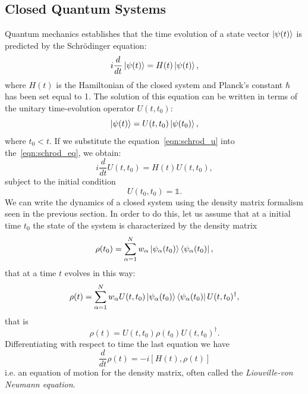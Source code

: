 \subsection{Closed Quantum Systems}
\label{closed_systems}
Quantum mechanics establishes that the time evolution of a state vector $\ket{\psi(t)}$ is predicted by the Schrödinger equation:
\begin{equation}
\label{eqn:schrod_eq}
    i\frac{d}{dt}\ket{\psi(t)} = H(t)\ket{\psi(t)},
\end{equation}
where $H(t)$ is the Hamiltonian of the closed system and Planck's constant $\hbar$ has been set equal to 1.
The solution of this equation can be written in terms of the unitary time-evolution operator $U(t, t_0)$:
\begin{equation}
\label{eqn:schrod_u}
    \ket{\psi(t)} = U(t, t_0)\ket{\psi(t_0)},
\end{equation}
where $t_0 < t$. If we substitute the equation~\ref{eqn:schrod_u} into the~\ref{eqn:schrod_eq}, we obtain:
\begin{equation}
    i\frac{d}{dt}U(t, t_0) = H(t)U(t, t_0),
\end{equation}
subject to the initial condition
\begin{equation}
    U(t_0, t_0) = \mathds{1}.
\end{equation}
We can write the dynamics of a closed system using the density matrix formalism seen in the previous section. In order to do this, let us assume that at a initial time $t_0$ the state of the system is characterized by the density matrix
\begin{equation*}
    \rho(t_0) = \sum_{\alpha = 1}^N w_\alpha \ket{\psi_\alpha(t_0)} \bra{\psi_\alpha(t_0)},
\end{equation*}
that at a time $t$ evolves in this way:
\begin{equation*}
    \rho(t) = \sum_{\alpha = 1}^N w_\alpha U(t,t_0)\ket{\psi_\alpha(t_0)} \bra{\psi_\alpha(t_0)}U(t,t_0)^\dagger,
\end{equation*}
that is
\begin{equation*}
     \rho(t) = U(t,t_0) \rho(t_0) U(t,t_0)^\dagger.
\end{equation*}
Differentiating with respect to time the last equation we have
\begin{equation}
\label{eqn:motion_closed_dm}
    \frac{d}{dt}\rho(t) = -i[H(t), \rho(t)]
\end{equation}
i.e. an equation of motion for the density matrix, often called the \emph{Liouville-von Neumann equation}.


